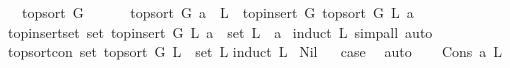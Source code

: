 \begin{isabellebody}
\ \ \ {\isachardoublequoteopen}top{\isacharunderscore}{\kern0pt}sort\ G\ {\isacharbrackleft}{\kern0pt}{\isacharbrackright}{\kern0pt}{\isacharequal}{\kern0pt}\ {\isacharbrackleft}{\kern0pt}{\isacharbrackright}{\kern0pt}\ {\isachardoublequoteclose}\isanewline
\ \ {\isacharbar}{\kern0pt}\ {\isachardoublequoteopen}top{\isacharunderscore}{\kern0pt}sort\ G\ {\isacharparenleft}{\kern0pt}a\ {\isacharhash}{\kern0pt}\ L{\isacharparenright}{\kern0pt}\ {\isacharequal}{\kern0pt}\ top{\isacharunderscore}{\kern0pt}insert\ G\ {\isacharparenleft}{\kern0pt}top{\isacharunderscore}{\kern0pt}sort\ G\ L{\isacharparenright}{\kern0pt}\ a{\isachardoublequoteclose}%
\isadelimdocument
%
\endisadelimdocument
%
\isatagdocument
%
\isamarkuptrue%
%
\endisatagdocument
{\isafolddocument}%
%
\isadelimdocument
%
\endisadelimdocument
{}\isamarkupfalse%
\ top{\isacharunderscore}{\kern0pt}insert{\isacharunderscore}{\kern0pt}set{\isacharcolon}{\kern0pt}\ {\isachardoublequoteopen}set\ {\isacharparenleft}{\kern0pt}top{\isacharunderscore}{\kern0pt}insert\ G\ L\ a{\isacharparenright}{\kern0pt}\ {\isacharequal}{\kern0pt}\ set\ L\ {\isasymunion}\ {\isacharbraceleft}{\kern0pt}a{\isacharbraceright}{\kern0pt}{\isachardoublequoteclose}\ \isanewline
%
\isadelimproof
%
\endisadelimproof
%
\isatagproof
{}\isamarkupfalse%
{\isacharparenleft}{\kern0pt}induct\ L{\isacharcomma}{\kern0pt}\ simp{\isacharunderscore}{\kern0pt}all{\isacharcomma}{\kern0pt}\ auto{\isacharparenright}{\kern0pt}\ \isamarkupfalse%
%
\endisatagproof
{\isafoldproof}%
%
\isadelimproof
\ \isanewline
%
\endisadelimproof
\isanewline
{}\isamarkupfalse%
\ top{\isacharunderscore}{\kern0pt}sort{\isacharunderscore}{\kern0pt}con{\isacharcolon}{\kern0pt}\ {\isachardoublequoteopen}set\ {\isacharparenleft}{\kern0pt}top{\isacharunderscore}{\kern0pt}sort\ G\ L{\isacharparenright}{\kern0pt}\ {\isacharequal}{\kern0pt}\ set\ L{\isachardoublequoteclose}\isanewline
%
\isadelimproof
%
\endisadelimproof
%
\isatagproof
{}\isamarkupfalse%
{\isacharparenleft}{\kern0pt}induct\ L{\isacharparenright}{\kern0pt}\isanewline
{}\isamarkupfalse%
\ Nil\isanewline
{}\isamarkupfalse%
\ \isamarkupfalse%
\ {\isacharquery}{\kern0pt}case\ \isamarkupfalse%
\ auto\isanewline
{}\isamarkupfalse%
\isanewline
\ \ \isamarkupfalse%
\ {\isacharparenleft}{\kern0pt}Cons\ a\ L{\isacharparenright}{\kern0pt}\isanewline
\ \ \isamarkupfalse%

\end{isabellebody}

